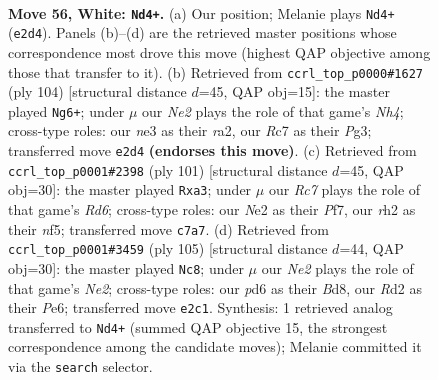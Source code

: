 \documentclass[11pt]{article}
\begin{document}
\clearpage

\begin{figure}[p]\centering
\begin{subfigure}{0.46\textwidth}\centering
\resizebox{\linewidth}{!}{%
\newchessgame
\chessboard[
  setfen={1r6/2R5/3pk3/8/6pp/1p2n3/3RN1Pr/6K1 w - - 2 56},
  showmover=false,
  pgfstyle=straightmove, color=movearrow, markmove={e2-d4}
]}
\caption{}
\end{subfigure}\hfill
\begin{subfigure}{0.46\textwidth}\centering
\resizebox{\linewidth}{!}{%
\newchessgame
\chessboard[
  setfen={5k2/5r2/p4R2/4p2p/P6N/2K3P1/r6p/3R4 w - - 1 53},
  showmover=false,
  pgfstyle=straightmove, color=movearrow, markmove={h4-g6}
]}
\caption{}
\end{subfigure}
\\[4pt]
\begin{subfigure}{0.46\textwidth}\centering
\resizebox{\linewidth}{!}{%
\newchessgame
\chessboard[
  setfen={8/2r2p2/p1P2k2/2R2N1P/7P/P2r4/5K2/8 b - - 4 51},
  showmover=false,
  pgfstyle=straightmove, color=movearrow, markmove={d3-a3}
]}
\caption{}
\end{subfigure}\hfill
\begin{subfigure}{0.46\textwidth}\centering
\resizebox{\linewidth}{!}{%
\newchessgame
\chessboard[
  setfen={r2b4/PR2n3/4pNk1/1P2P3/3r4/R7/7p/7K b - - 0 53},
  showmover=false,
  pgfstyle=straightmove, color=movearrow, markmove={e7-c8}
]}
\caption{}
\end{subfigure}
\caption{\textbf{Move 56, White: \texttt{Nd4+}.} (a) Our position; Melanie plays \texttt{Nd4+} (\texttt{e2d4}). Panels (b)--(d) are the retrieved master positions whose correspondence most drove this move (highest QAP objective among those that transfer to it). (b) Retrieved from \texttt{ccrl\_top\_p0000\#1627} (ply 104) [structural distance $d$=45, QAP obj=15]: the master played \texttt{Ng6+}; under $\mu$ our \emph{Ne2} plays the role of that game's \emph{Nh4}; cross-type roles: our \emph{n}e3 as their \emph{r}a2, our \emph{R}c7 as their \emph{P}g3; transferred move \texttt{e2d4} \textbf{(endorses this move)}. (c) Retrieved from \texttt{ccrl\_top\_p0001\#2398} (ply 101) [structural distance $d$=45, QAP obj=30]: the master played \texttt{Rxa3}; under $\mu$ our \emph{Rc7} plays the role of that game's \emph{Rd6}; cross-type roles: our \emph{N}e2 as their \emph{P}f7, our \emph{r}h2 as their \emph{n}f5; transferred move \texttt{c7a7}. (d) Retrieved from \texttt{ccrl\_top\_p0001\#3459} (ply 105) [structural distance $d$=44, QAP obj=30]: the master played \texttt{Nc8}; under $\mu$ our \emph{Ne2} plays the role of that game's \emph{Ne2}; cross-type roles: our \emph{p}d6 as their \emph{B}d8, our \emph{R}d2 as their \emph{P}e6; transferred move \texttt{e2c1}. Synthesis: 1 retrieved analog transferred to \texttt{Nd4+} (summed QAP objective 15, the strongest correspondence among the candidate moves); Melanie committed it via the \texttt{search} selector.}
\label{fig:thought-m110}
\end{figure}
\end{document}
